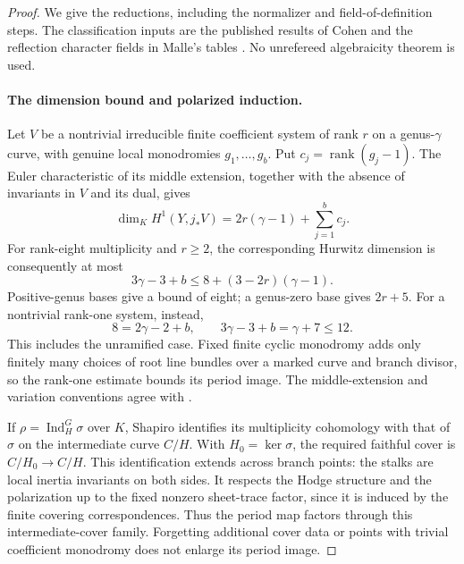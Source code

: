 \begin{proof}
We give the reductions, including the normalizer and field-of-definition
steps. The classification inputs are the published results of Cohen
\cite{CohenReflection,CohenCorrection} and the reflection character fields
in Malle's tables \cite{MalleFields}. No unrefereed algebraicity theorem
is used.

\paragraph{The dimension bound and polarized induction.}
Let $V$ be a nontrivial irreducible finite coefficient system of rank $r$
on a genus-$\gamma$ curve, with genuine local monodromies $g_1,\ldots,g_b$.
Put $c_j=\operatorname{rank}(g_j-1)$. The Euler characteristic of its middle extension,
together with the absence of invariants in $V$ and its dual, gives
\[
 \dim_K H^1(Y,j_*V)=2r(\gamma-1)+\sum_{j=1}^b c_j.
 \label{eq:curve-euler}
\]
For rank-eight multiplicity and $r\ge2$, the corresponding Hurwitz
dimension is consequently at most
\[
 3\gamma-3+b\le8+(3-2r)(\gamma-1).
 \label{eq:curve-dimension}
\]
Positive-genus bases give a bound of eight; a genus-zero base gives
$2r+5$. For a nontrivial rank-one system, instead,
\[
 8=2\gamma-2+b,
 \qquad 3\gamma-3+b=\gamma+7\le12.
 \label{eq:rank-one-curve-dimension}
\]
This includes the unramified case. Fixed finite cyclic monodromy adds
only finitely many choices of root line bundles over a marked curve and
branch divisor, so the rank-one estimate bounds its period image. The middle-extension and
variation conventions agree with \cite[Proposition~1.1, Lemma~1.2,
Remark~1.3 and Theorem~2.5]{DettweilerWewers}.

If $\rho=\operatorname{Ind}_H^G\sigma$ over $K$, Shapiro identifies its multiplicity
cohomology with that of $\sigma$ on the intermediate curve
$C/H$. With $H_0=\ker\sigma$, the required faithful cover is
$C/H_0\to C/H$. This identification extends across branch points:
the stalks are local inertia invariants on both sides. It respects the
Hodge structure and the polarization up to the fixed nonzero sheet-trace
factor, since it is induced by the finite covering correspondences.
Thus the period map factors through this intermediate-cover family.
Forgetting additional cover data or points with trivial coefficient
monodromy does not enlarge its period image.


\end{proof}
